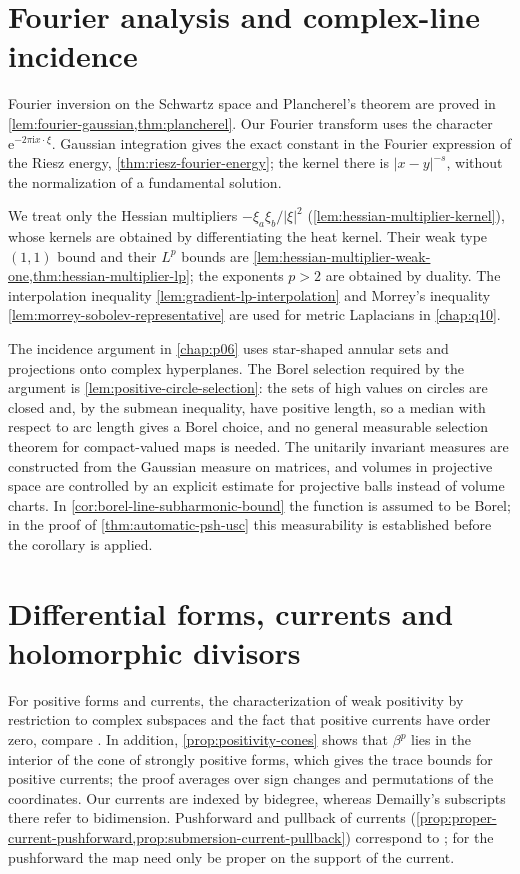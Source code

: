 \section{Fourier analysis and complex-line incidence}
\label{sec:history-fourier-incidence}
Fourier inversion on the Schwartz space and Plancherel's theorem are proved in \cref{lem:fourier-gaussian,thm:plancherel}. Our Fourier transform uses the character $\mathrm e^{-2\pi\mathrm i x\cdot\xi}$. Gaussian integration gives the exact constant in the Fourier expression of the Riesz energy, \cref{thm:riesz-fourier-energy}; the kernel there is $|x-y|^{-s}$, without the normalization of a fundamental solution.

We treat only the Hessian multipliers $-\xi_a\xi_b/|\xi|^2$ (\cref{lem:hessian-multiplier-kernel}), whose kernels are obtained by differentiating the heat kernel. Their weak type $(1,1)$ bound and their $L^p$ bounds are \cref{lem:hessian-multiplier-weak-one,thm:hessian-multiplier-lp}; the exponents $p>2$ are obtained by duality. The interpolation inequality \cref{lem:gradient-lp-interpolation} and Morrey's inequality \cref{lem:morrey-sobolev-representative} are used for metric Laplacians in \cref{chap:q10}.

The incidence argument in \cref{chap:p06} uses star-shaped annular sets and projections onto complex hyperplanes. The Borel selection required by the argument is \cref{lem:positive-circle-selection}: the sets of high values on circles are closed and, by the submean inequality, have positive length, so a median with respect to arc length gives a Borel choice, and no general measurable selection theorem for compact-valued maps is needed. The unitarily invariant measures are constructed from the Gaussian measure on matrices, and volumes in projective space are controlled by an explicit estimate for projective balls instead of volume charts. In \cref{cor:borel-line-subharmonic-bound} the function is assumed to be Borel; in the proof of \cref{thm:automatic-psh-usc} this measurability is established before the corollary is applied.

\section{Differential forms, currents and holomorphic divisors}
\label{sec:history-complex-currents}
For positive forms and currents, the characterization of weak positivity by restriction to complex subspaces and the fact that positive currents have order zero, compare \cite[Chapter III, Section 1.A--B, especially (1.4), (1.6) and (1.14)]{DemBook}. In addition, \cref{prop:positivity-cones} shows that $\beta^p$ lies in the interior of the cone of strongly positive forms, which gives the trace bounds for positive currents; the proof averages over sign changes and permutations of the coordinates. Our currents are indexed by bidegree, whereas Demailly's subscripts there refer to bidimension. Pushforward and pullback of currents (\cref{prop:proper-current-pushforward,prop:submersion-current-pullback}) correspond to \cite[Chapter III, (1.17)]{DemBook}; for the pushforward the map need only be proper on the support of the current.

